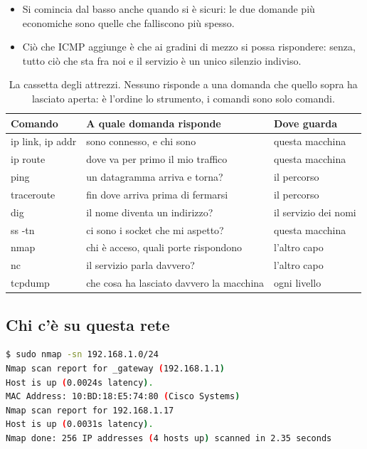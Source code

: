 \begin{itemize}
    \item Si comincia dal basso anche quando si è sicuri: le due domande più economiche sono quelle che falliscono più spesso.
    \item Ciò che ICMP aggiunge è che ai gradini di mezzo si possa rispondere: senza, tutto ciò che sta fra noi e il servizio è
          un unico silenzio indiviso.
\end{itemize}

\begin{table}[H]
\centering
\begin{tabular}{>{\ttfamily}l l l}
\toprule
\normalfont\textbf{Comando} & \textbf{A quale domanda risponde} & \textbf{Dove guarda} \\
\midrule
ip link, ip addr & sono connesso, e chi sono                  & questa macchina \\
ip route         & dove va per primo il mio traffico          & questa macchina \\
ping             & un datagramma arriva e torna?              & il percorso \\
traceroute       & fin dove arriva prima di fermarsi          & il percorso \\
dig              & il nome diventa un indirizzo?              & il servizio dei nomi \\
ss -tn           & ci sono i socket che mi aspetto?           & questa macchina \\
nmap             & chi è acceso, quali porte rispondono       & l'altro capo \\
nc               & il servizio parla davvero?                 & l'altro capo \\
tcpdump          & che cosa ha lasciato davvero la macchina   & ogni livello \\
\bottomrule
\end{tabular}
\caption{La cassetta degli attrezzi. Nessuno risponde a una domanda che quello sopra ha lasciato aperta: è l'ordine lo
         strumento, i comandi sono solo comandi.}
\end{table}

\subsection{Chi c'è su questa rete}

\begin{lstlisting}[language=bash, title={nmap -sn: chi esiste, senza toccare le porte}]
$ sudo nmap -sn 192.168.1.0/24
Nmap scan report for _gateway (192.168.1.1)
Host is up (0.0024s latency).
MAC Address: 10:BD:18:E5:74:80 (Cisco Systems)
Nmap scan report for 192.168.1.17
Host is up (0.0031s latency).
Nmap done: 256 IP addresses (4 hosts up) scanned in 2.35 seconds
\end{lstlisting}

